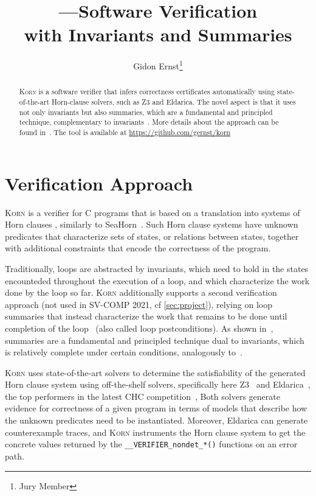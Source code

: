 \documentclass{llncs}
\author{Gidon Ernst\thanks{Jury Member}}
\title{\Korn---Software Verification \\ with Invariants and Summaries}
\institute{LMU Munich \\ \mailto{gidon.ernst@lmu.de}}
\newcommand{\Korn}{\textsc{Korn}\xspace}
\begin{document}
\maketitle

\begin{abstract}
    \Korn is a software verifier that infers correctness certificates automatically using state-of-the-art Horn-clause solvers, such as Z3 and Eldarica.
    The novel aspect is that it uses not only invariants but also summaries, which are a fundamental and principled technique, complementary to invariants~\cite{hehner1999refinement,hehner2005specified,tuerk2010local}.
    More details about the approach can be found in~\cite{ernst:arxiv2020:summaries}.
    The tool is available at \url{https://github.com/gernst/korn}

\end{abstract}

\section{Verification Approach}
\label{sec:approach}

\Korn is a verifier for C programs that is based on a translation into systems of Horn clauses
\cite{bjorner2015horn,gurfinkel2019science}, similarly to SeaHorn~\cite{gurfinkel2015seahorn}.
Such Horn clause systems have unknown predicates that characterize sets of states,
or relations between states, together with additional constraints that encode the correctness of the program.

Traditionally, loops are abstracted by invariants, which need to hold in the states
encounteded throughout the execution of a loop, and which characterize the work done by the loop so far.
\Korn additionally supports a second verification approach (not used in SV-COMP 2021, cf \cref{sec:project}), relying on loop summaries that instead characterize
the work that remains to be done until completion of the loop~\cite{hehner1999refinement,tuerk2010local,hehner2005specified}
(also called loop postconditions).
As shown in~\cite{ernst:arxiv2020:summaries}, summaries are a fundamental and principled technique dual to invariants,
which is relatively complete under certain conditions, analogously to~\cite{hoare1969axiomatic}.

\Korn uses state-of-the-art solvers to determine the satisfiability of the generated Horn clause system
using off-the-shelf solvers, specifically here Z3~\cite{bjorner2013solving} and Eldarica~\cite{hojjat2018eldarica},
the top performers in the latest CHC competition~\cite{rummer2020competition},
Both solvers generate evidence for correctness of a given program in terms of models that describe how the unknown predicates need to be instantiated.
Moreover, Eldarica can generate counterexample traces, and \Korn instruments the Horn clause system to get
the concrete values returned by the \texttt{\_\_VERIFIER\_nondet\_*()} functions on an error path.
\end{document}
